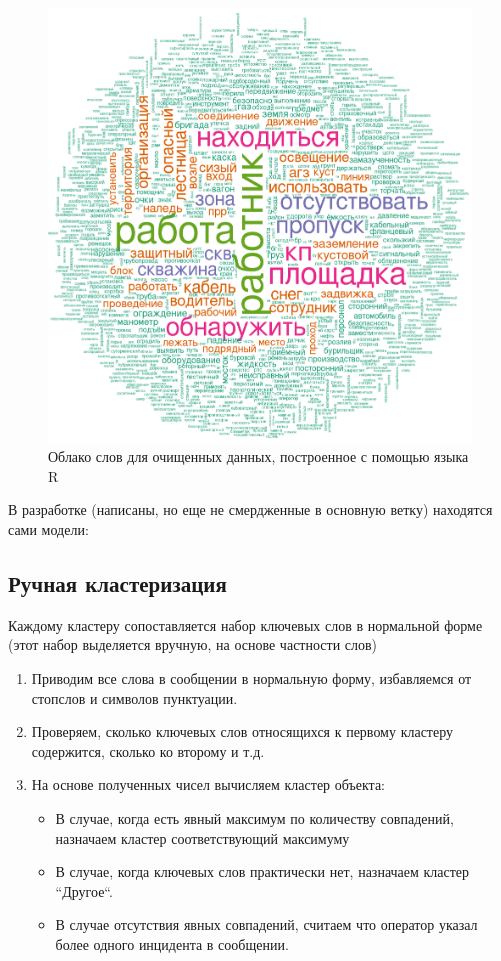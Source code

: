 \documentclass{article}
\begin{document}
\begin{figure}[h!]
    \centering
    \includegraphics[scale=0.2]{image.png}
    \caption{Облако слов для очищенных данных, построенное с помощью языка R}
\end{figure}

В разработке (написаны, но еще не смердженные в основную ветку) находятся сами модели:

\subsection{Ручная кластеризация}
Каждому кластеру сопоставляется набор ключевых слов в нормальной форме (этот набор выделяется вручную, на основе частности слов)
\begin{enumerate}
    \item Приводим все слова в сообщении в нормальную форму, избавляемся от стопслов и символов пунктуации. 
    \item Проверяем, сколько ключевых слов относящихся к первому кластеру содержится, сколько ко второму и т.д. 
    \item На основе полученных чисел вычисляем кластер объекта:
    \begin{itemize}
        \item В случае, когда есть явный максимум по количеству совпадений, назначаем кластер соответствующий максимуму
        \item В случае, когда ключевых слов практически нет, назначаем кластер ``Другое``.
        \item В случае отсутствия явных совпадений, считаем что оператор указал более одного инцидента в сообщении. 
    \end{itemize}
\end{enumerate}
\end{document}
